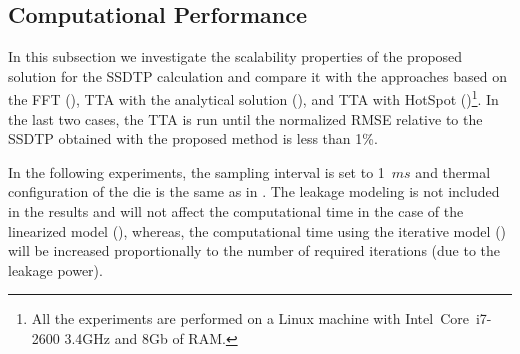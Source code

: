 \subsection{Computational Performance} \label{sec:results-ssdtp}
In this subsection we investigate the scalability properties of the proposed solution for the SSDTP calculation and compare it with the approaches based on the FFT (), TTA with the analytical solution (), and TTA with HotSpot ()\footnote{All the experiments are performed on a Linux machine with Intel\textregistered\ Core\texttrademark\ i7-2600 3.4GHz and 8Gb of RAM.}. In the last two cases, the TTA is run until the normalized RMSE relative to the SSDTP obtained with the proposed method is less than 1\%.

In the following experiments, the sampling interval is set to \mbox{1 $ms$} and thermal configuration of the die is the same as in . The leakage modeling is not included in the results and will not affect the computational time in the case of the linearized model (), whereas, the computational time using the iterative model () will be increased proportionally to the number of required iterations (due to the leakage power).


